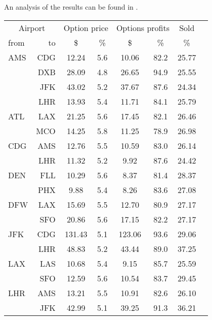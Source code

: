 An analysis of the results can be found in .
\\[2em]
\begin{table}[h]
    \begin{center}
        \begin{tabular}{l r c c c c c c}
            \toprule
            \multicolumn{2}{c}{Airport}  & \multicolumn{2}{c}{Option price} & \multicolumn{2}{c}{Options profits}  &  Sold  \\[.4ex]
            from  &  to  &  \$  & \%  &  \$  & \%  & \%  \\
            \midrule
AMS  &  CDG &   12.24  &     5.6  &   10.06  &    82.2  &   25.77  \\
     &  DXB &   28.09  &     4.8  &   26.65  &    94.9  &   25.55  \\
     &  JFK &   43.02  &     5.2  &   37.67  &    87.6  &   24.34  \\
     &  LHR &   13.93  &     5.4  &   11.71  &    84.1  &   25.79  \\[.5ex]
ATL  &  LAX &   21.25  &     5.6  &   17.45  &    82.1  &   26.46  \\
     &  MCO &   14.25  &     5.8  &   11.25  &    78.9  &   26.98  \\[.5ex]
CDG  &  AMS &   12.76  &     5.5  &   10.59  &    83.0  &   26.14  \\
     &  LHR &   11.32  &     5.2  &    9.92  &    87.6  &   24.42  \\[.5ex]
DEN  &  FLL &   10.29  &     5.6  &    8.37  &    81.4  &   28.37  \\
     &  PHX &    9.88  &     5.4  &    8.26  &    83.6  &   27.08  \\[.5ex]
DFW  &  LAX &   15.69  &     5.5  &   12.70  &    80.9  &   27.17  \\
     &  SFO &   20.86  &     5.6  &   17.15  &    82.2  &   27.17  \\[.5ex]
JFK  &  CDG &  131.43  &     5.1  &  123.06  &    93.6  &   29.06  \\
     &  LHR &   48.83  &     5.2  &   43.44  &    89.0  &   37.25  \\[.5ex]
LAX  &  LAS &   10.68  &     5.4  &    9.15  &    85.7  &   25.59  \\
     &  SFO &   12.59  &     5.6  &   10.54  &    83.7  &   29.45  \\[.5ex]
LHR  &  AMS &   13.21  &     5.5  &   10.91  &    82.6  &   26.10  \\
     &  JFK &   42.99  &     5.1  &   39.25  &    91.3  &   36.21  \\

\end{tabular}
\end{center}
\end{table}
